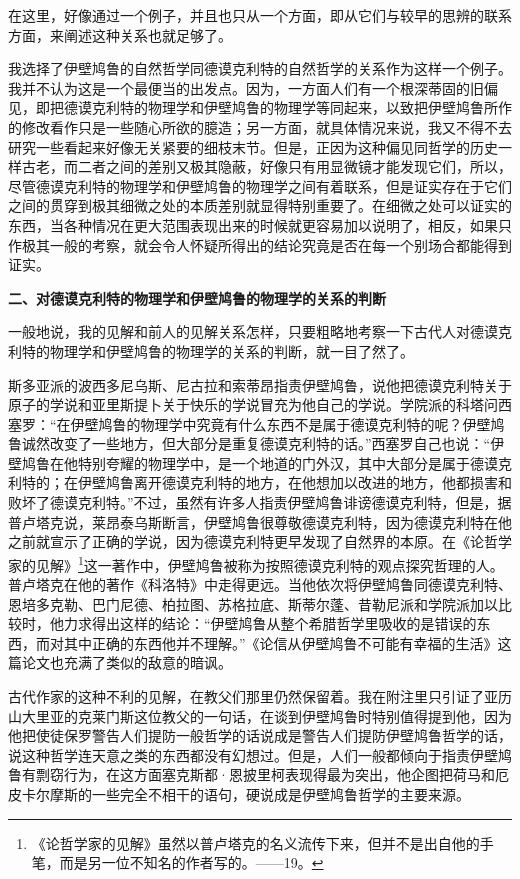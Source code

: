 \documentclass[a4paper,twoside,12pt]{ctexart}
\begin{document}
在这里，好像通过一个例子，并且也只从一个方面，即从它们与较早的思辨的联系方面，来阐述这种关系也就足够了。

我选择了伊壁鸠鲁的自然哲学同德谟克利特的自然哲学的关系作为这样一个例子。我并不认为这是一个最便当的出发点。因为，一方面人们有一个根深蒂固的旧偏见，即把德谟克利特的物理学和伊壁鸠鲁的物理学等同起来，以致把伊壁鸠鲁所作的修改看作只是一些随心所欲的臆造；另一方面，就具体情况来说，我又不得不去研究一些看起来好像无关紧要的细枝末节。但是，正因为这种偏见同哲学的历史一样古老，而二者之间的差别又极其隐蔽，好像只有用显微镜才能发现它们，所以，尽管德谟克利特的物理学和伊壁鸠鲁的物理学之间有着联系，但是证实存在于它们之间的贯穿到极其细微之处的本质差别就显得特别重要了。在细微之处可以证实的东西，当各种情况在更大范围表现出来的时候就更容易加以说明了，相反，如果只作极其一般的考察，就会令人怀疑所得出的结论究竟是否在每一个别场合都能得到证实。

\textbf{二、对德谟克利特的物理学和伊壁鸠鲁的物理学的关系的判断}

一般地说，我的见解和前人的见解关系怎样，只要粗略地考察一下古代人对德谟克利特的物理学和伊壁鸠鲁的物理学的关系的判断，就一目了然了。

斯多亚派的波西多尼乌斯、尼古拉和索蒂昂指责伊壁鸠鲁，说他把德谟克利特关于原子的学说和亚里斯提卜关于快乐的学说冒充为他自己的学说。学院派的科塔问西塞罗：“在伊壁鸠鲁的物理学中究竟有什么东西不是属于德谟克利特的呢？伊壁鸠鲁诚然改变了一些地方，但大部分是重复德谟克利特的话。”西塞罗自己也说：“伊壁鸠鲁在他特别夸耀的物理学中，是一个地道的门外汉，其中大部分是属于德谟克利特的；在伊壁鸠鲁离开德谟克利特的地方，在他想加以改进的地方，他都损害和败坏了德谟克利特。”不过，虽然有许多人指责伊壁鸠鲁诽谤德谟克利特，但是，据普卢塔克说，莱昂泰乌斯断言，伊壁鸠鲁很尊敬德谟克利特，因为德谟克利特在他之前就宣示了正确的学说，因为德谟克利特更早发现了自然界的本原。在《论哲学家的见解》\footnote{《论哲学家的见解》虽然以普卢塔克的名义流传下来，但并不是出自他的手笔，而是另一位不知名的作者写的。——19。}这一著作中，伊壁鸠鲁被称为按照德谟克利特的观点探究哲理的人。普卢塔克在他的著作《科洛特》中走得更远。当他依次将伊壁鸠鲁同德谟克利特、恩培多克勒、巴门尼德、柏拉图、苏格拉底、斯蒂尔蓬、昔勒尼派和学院派加以比较时，他力求得出这样的结论：“伊壁鸠鲁从整个希腊哲学里吸收的是错误的东西，而对其中正确的东西他并不理解。”《论信从伊壁鸠鲁不可能有幸福的生活》这篇论文也充满了类似的敌意的暗讽。

古代作家的这种不利的见解，在教父们那里仍然保留着。我在附注里只引证了亚历山大里亚的克莱门斯这位教父的一句话，在谈到伊壁鸠鲁时特别值得提到他，因为他把使徒保罗警告人们提防一般哲学的话说成是警告人们提防伊壁鸠鲁哲学的话，说这种哲学连天意之类的东西都没有幻想过。但是，人们一般都倾向于指责伊壁鸠鲁有剽窃行为，在这方面塞克斯都·恩披里柯表现得最为突出，他企图把荷马和厄皮卡尔摩斯的一些完全不相干的语句，硬说成是伊壁鸠鲁哲学的主要来源。
\end{document}
